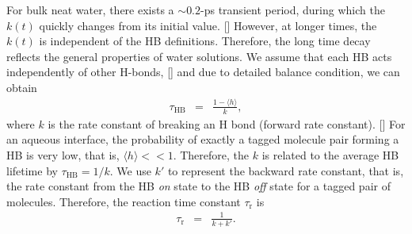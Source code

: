 For bulk neat water, there exists a $\sim 0.2$-ps transient period,
during which the $k(t)$ quickly changes from its initial value. [\cite{FWS00}]
However, at longer times, the $k(t)$ is independent of the HB definitions.
Therefore, the long time decay reflects the general properties of water solutions.
We assume that each HB acts independently of other H-bonds, [\cite{AL96,AL00}] 
and due to detailed balance condition, we can obtain 
\begin{eqnarray}
  \tau_{\text{HB}} &=& \frac{1- \langle h\rangle}{k},
\label{eq:rate}
\end{eqnarray}
where $k$ is the rate constant of breaking an H bond (forward rate constant). [\cite{Chandler1978,Chandler1986}] 
For an aqueous interface, the probability of exactly a tagged molecule pair forming a HB is very low, that is, $\langle h\rangle << 1$. Therefore,
the $k$ is related to the average HB lifetime by $\tau_{\text{HB}}=1/k$.
We use $k'$ to represent the backward rate constant, that is, the rate constant from the HB \emph{on} state to the HB \emph{off} state for a tagged pair of molecules.
Therefore, the reaction time constant $\tau_{\text{r}}$ is 
\begin{eqnarray}
  \tau_{\text{r}} &=& \frac{1}{k+k'}.
\label{eq:reaction_rate_tau}
\end{eqnarray}


\FloatBarrier
